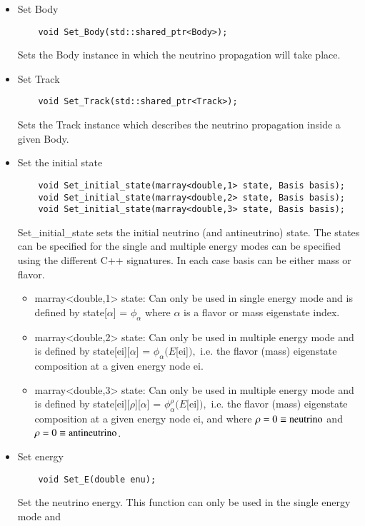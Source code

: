 \begin{itemize}
  \item Set {\ttfamily Body}
  \begin{lstlisting}
    void Set_Body(std::shared_ptr<Body>);
  \end{lstlisting}
  Sets the {\ttf Body} instance in which the neutrino propagation will take place.
  \item Set {\ttfamily Track}
  \begin{lstlisting}
    void Set_Track(std::shared_ptr<Track>);
  \end{lstlisting}
  Sets the {\ttf Track} instance which describes the neutrino propagation inside a
  given {\ttf Body}.
  \item Set the initial state
  \begin{lstlisting}
    void Set_initial_state(marray<double,1> state, Basis basis);
    void Set_initial_state(marray<double,2> state, Basis basis);
    void Set_initial_state(marray<double,3> state, Basis basis);
  \end{lstlisting}
  {\ttf Set\_initial\_state} sets the initial neutrino (and antineutrino) state. The states
  can be specified for the single and multiple energy modes can be specified using the 
  different {\ttf C++} signatures. In each case {\ttf basis} can be either {\ttf mass} or {\ttf flavor}.
  \begin{itemize}
  	\item {\ttf marray<double,1> state}: 
	Can only be used in single energy mode and is defined by 
	{\ttf state[$\alpha$]  = $\phi_\alpha$ } where $\alpha$ is a flavor or mass eigenstate index.
	\item {\ttf marray<double,2> state}: Can only be used in multiple energy mode and is defined
	by {\ttf state[ei][$\alpha$]  = $\phi_\alpha (E$[ei]$),$ } i.e. the flavor (mass) eigenstate composition at a given energy node {\ttf ei}.
	\item {\ttf marray<double,3> state}: Can only be used in multiple energy mode and is defined
	by {\ttf state[ei][$\rho$][$\alpha$]  = $\phi^{\rho}_\alpha (E$[ei]$),$ } i.e. the flavor (mass) eigenstate composition at a given energy node {\ttf ei}, and where $\rho = 0 \equiv {\rm neutrino}$ and $\rho = 0 \equiv {\rm antineutrino}$.
  \end{itemize}
  \item Set energy
  \begin{lstlisting}
    void Set_E(double enu);
  \end{lstlisting}
  Set the neutrino energy. This function can only be used in the single energy mode and

\end{itemize}
